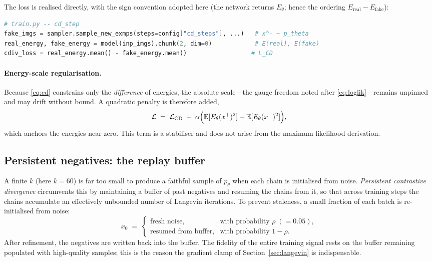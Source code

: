 The loss is realised directly, with the sign convention adopted here (the network returns
$E_\theta$; hence the ordering $E_{\mathrm{real}} - E_{\mathrm{fake}}$):
\begin{lstlisting}[language=Python]
# train.py -- cd_step
fake_imgs = sampler.sample_new_exmps(steps=config["cd_steps"], ...)   # x^- ~ p_theta
real_energy, fake_energy = model(inp_imgs).chunk(2, dim=0)            # E(real), E(fake)
cdiv_loss = real_energy.mean() - fake_energy.mean()                  # L_CD
\end{lstlisting}

\paragraph{Energy-scale regularisation.} Because \eqref{eq:cd} constrains only the
\emph{difference} of energies, the absolute scale---the gauge freedom noted after
\eqref{eq:loglik}---remains unpinned and may drift without bound. A quadratic penalty is
therefore added,
\begin{equation}
  \mathcal{L} \;=\; \mathcal{L}_{\mathrm{CD}}
    \;+\; \alpha\Bigl(\mathbb{E}[E_\theta(x^+)^2] + \mathbb{E}[E_\theta(x^-)^2]\Bigr),
  \label{eq:reg}
\end{equation}
which anchors the energies near zero. This term is a stabiliser and does not arise from
the maximum-likelihood derivation.

\subsection{Persistent negatives: the replay buffer}

A finite $k$ (here $k=60$) is far too small to produce a faithful sample of $p_\theta$ when
each chain is initialised from noise. \emph{Persistent contrastive divergence} circumvents
this by maintaining a buffer of past negatives and resuming the chains from it, so that
across training steps the chains accumulate an effectively unbounded number of Langevin
iterations. To prevent staleness, a small fraction of each batch is re-initialised from
noise:
\begin{equation}
  x_0 \;=\;
  \begin{cases}
    \text{fresh noise}, & \text{with probability } \rho \;(=0.05),\\[2pt]
    \text{resumed from buffer}, & \text{with probability } 1-\rho.
  \end{cases}
  \label{eq:buffer}
\end{equation}
After refinement, the negatives are written back into the buffer. The fidelity of the
entire training signal rests on the buffer remaining populated with high-quality samples;
this is the reason the gradient clamp of Section~\ref{sec:langevin} is indispensable.


